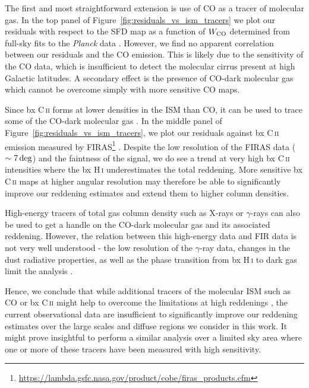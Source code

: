 \documentclass[iop,apj]{emulateapj}
\makeatletter
\def\testbx{bx}%
\DeclareRobustCommand{\ion}[2]{%
\relax\ifmmode
\ifx\testbx\f@series
{\mathbf{#1\,\mathsc{#2}}}\else
{\mathrm{#1\,\mathsc{#2}}}\fi
\else\textup{#1\,{\mdseries\textsc{#2}}}%
\fi}
\makeatother
\begin{document}
The first and most straightforward extension is use of CO as a tracer of molecular gas. In the top panel of Figure~\ref{fig:residuals_vs_ism_tracers} we plot our residuals with respect to the SFD map as a function of $W_{\rm CO}$ determined from full-sky fits to the {\it Planck} data \citep{Planck_2015_X}. However, we find no apparent correlation between our residuals and the CO emission. This is likely due to the sensitivity of the CO data, which is insufficient to detect the molecular cirrus present at high Galactic latitudes. A secondary effect is the presence of CO-dark molecular gas \citep[e.g.][]{Wolfire+etal_2010} which cannot be overcome simply with more sensitive CO maps.

Since \ion{C}{ii} forms at lower densities in the ISM than CO, it can be used to trace some of the CO-dark molecular gas \citep{Langer+etal_2010, Pineda+etal_2013, Pineda+etal_2017}. In the middle panel of Figure~\ref{fig:residuals_vs_ism_tracers}, we plot our residuals against \ion{C}{ii} emission measured by FIRAS\footnote{\url{https://lambda.gsfc.nasa.gov/product/cobe/firas\_products.cfm}} \citep{Bennett+etal_1994}. Despite the low resolution of the FIRAS data ($\sim 7\,\rm deg$) and the faintness of the signal, we do see a trend at very high \ion{C}{ii} intensities where the \ion{H}{i} underestimates the total reddening. More sensitive \ion{C}{ii} maps at higher angular resolution may therefore be able to significantly improve our reddening estimates and extend them to higher column densities.

High-energy tracers of total gas column density such as X-rays or $\gamma$-rays can also be used to get a handle on the CO-dark molecular gas and its associated reddening. However, the relation between this high-energy data and FIR data is not very well understood - the low resolution of the $\gamma$-ray data, changes in the dust radiative properties, as well as the phase transition from \ion{H}{i} to dark gas limit the analysis \citep{Planck_2015_XXVIII}.

Hence, we conclude that while additional tracers of the molecular ISM such as CO or \ion{C}{ii} might help to overcome the limitations at high reddenings \citep{Allen+etal_2015, Pineda+etal_2017}, the current observational data are insufficient to significantly improve our reddening estimates over the large scales and diffuse regions we consider in this work. It might prove insightful to perform a similar analysis over a limited sky area where one or more of these tracers have been measured with high sensitivity. 
\end{document}
